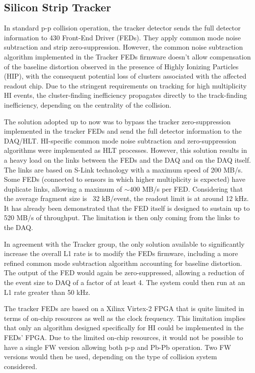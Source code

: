 \subsection{Silicon Strip Tracker\label{subsec:SiTracker}}
In standard p-p collision operation, the tracker detector sends the full detector information to 430 Front-End Driver (FEDs). They apply common mode noise subtraction and strip zero-suppression. However, the common noise subtraction algorithm implemented in the Tracker FEDs firmware doesn't allow compensation of the baseline distortion observed in the presence of Highly Ionizing Particles (HIP), with the consequent potential loss of clusters associated with the affected readout chip. Due to the stringent requirements on tracking for high multiplicity HI events, the cluster-finding inefficiency propagates directly to the track-finding inefficiency, depending on the centrality of the collision.  

The solution adopted up to now was to bypass the tracker zero-suppression implemented in the tracker FEDs and send the full detector information to the DAQ/HLT. HI-specific common mode noise subtraction and zero-suppression algorithms were implemented as HLT processes. However, this solution results in a heavy load on the links between the FEDs and the DAQ and on the DAQ itself. The links are based on S-Link technology with a maximum speed of 200 MB/s. Some FEDs (connected to sensors in which higher multiplicity is expected) have duplicate links, allowing a maximum of $\sim 400$ MB/s per FED.  Considering that the average fragment size is ~32 kB/event, the readout limit is at around 12 kHz. It has already been demonstrated that the FED itself is designed to sustain up to 520 MB/s of throughput. The limitation is then only coming from the links to the DAQ. 

In agreement with the Tracker group, the only solution available to significantly increase the overall L1 rate is to modify the FEDs firmware, including a more refined common mode subtraction algorithm accounting for baseline distortion. The output of the FED would again be zero-suppressed, allowing a reduction of the event size to DAQ of a factor of at least 4. The system could then run at an L1 rate greater than 50 kHz. 

The tracker FEDs are based on a Xilinx Virtex-2 FPGA that is quite limited in terms of on-chip resources as well as the clock frequency. This limitation implies that only an algorithm designed specifically for HI could be implemented in the FEDs' FPGA. Due to the limited on-chip resources, it would not be possible to have a single FW version allowing both p-p and Pb-Pb operation. Two FW versions would then be used, depending on the type of collision system considered. 

